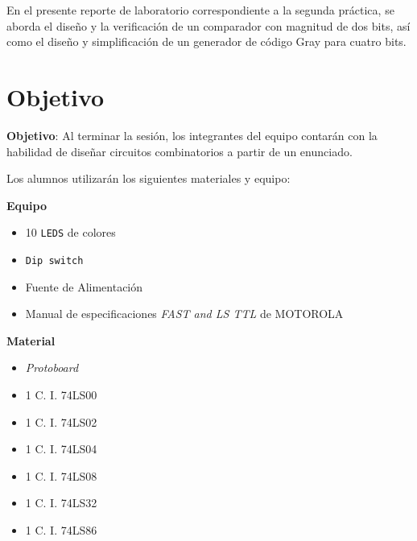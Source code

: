 \documentclass[a4paper,12pt]{article}
\begin{document}
\newpage

\tableofcontents

\newpage


En el presente reporte de laboratorio correspondiente a la segunda práctica, se aborda el diseño y la verificación de un comparador con magnitud de dos bits, así como el diseño y simplificación de un generador de código Gray para cuatro bits.\par 

\section*{Objetivo}

\textbf{Objetivo}: Al terminar la sesión, los integrantes del equipo contarán con la habilidad de diseñar circuitos combinatorios a partir de un enunciado.\par

\vspace{.5cm}

Los alumnos utilizarán los siguientes materiales y equipo:

\begin{multicols}{2}
\textbf{Equipo}\\
\begin{itemize}[nosep]
		\item 10 \texttt{LEDS} de colores
		\item \texttt{Dip switch}
		\item Fuente de Alimentación
		\item Manual de especificaciones \textit{FAST and LS TTL} de MOTOROLA\textregistered
\end{itemize}

\columnbreak

\textbf{Material}\\
\begin{itemize}[nosep]
		\item \textit{Protoboard}
		\item 1 C. I. 74LS00
		\item 1 C. I. 74LS02
		\item 1 C. I. 74LS04
		\item 1 C. I. 74LS08
		\item 1 C. I. 74LS32
		\item 1 C. I. 74LS86
	
\end{itemize}

\end{multicols}
\end{document}
